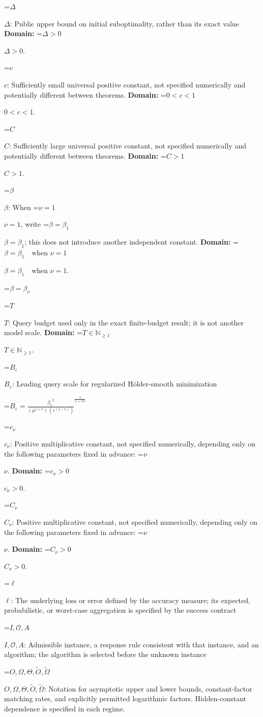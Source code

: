 \documentclass[10pt,a4paper]{article}
\newcommand{\AtlasMath}[1]{\par\begingroup\centering\setbox0=\hbox{$\displaystyle #1$}\ifdim\wd0>1.4\linewidth\typeout{ATLAS WIDE FORMULA: \the\wd0}\fi\ifdim\wd0>\linewidth\resizebox{\linewidth}{!}{\box0}\else\box0\fi\par\endgroup}
\newcommand{\AtlasInlineMath}[1]{\begingroup\setbox0=\hbox{$#1$}\ifdim\wd0>.4\linewidth\endgroup\AtlasMath{#1}\else\endgroup$#1$\fi}
\begin{document}
\AtlasInlineMath{\Delta}: Public upper bound on initial suboptimality, rather than its exact value \textbf{Domain:} \AtlasInlineMath{\Delta>0}.

\AtlasInlineMath{c}: Sufficiently small universal positive constant, not specified numerically and potentially different between theorems. \textbf{Domain:} \AtlasInlineMath{0<c<1}.

\AtlasInlineMath{C}: Sufficiently large universal positive constant, not specified numerically and potentially different between theorems. \textbf{Domain:} \AtlasInlineMath{C>1}.

\AtlasInlineMath{\beta}: When \AtlasInlineMath{\nu=1}, write \AtlasInlineMath{\beta=\beta_1}; this does not introduce another independent constant. \textbf{Domain:} \AtlasInlineMath{\beta=\beta_1\quad\text{when }\nu=1}.


\AtlasMath{\beta=\beta_\nu}


\AtlasInlineMath{T}: Query budget used only in the exact finite-budget result; it is not another model scale. \textbf{Domain:} \AtlasInlineMath{T\in\mathbb{N}_{\ge1}}.

\AtlasInlineMath{B_\varepsilon}: Leading query scale for regularized Hölder-smooth minimization


\AtlasMath{B_\varepsilon={\frac{{\beta_\nu}^{2}}{({\mu}^{1+\nu})\,({\varepsilon}^{(1-\nu)})}}^{\frac{1}{1+3\,\nu}}}


\AtlasInlineMath{c_{\nu}}: Positive multiplicative constant, not specified numerically, depending only on the following parameters fixed in advance: \AtlasInlineMath{\nu}. \textbf{Domain:} \AtlasInlineMath{c_{\nu}>0}.

\AtlasInlineMath{C_{\nu}}: Positive multiplicative constant, not specified numerically, depending only on the following parameters fixed in advance: \AtlasInlineMath{\nu}. \textbf{Domain:} \AtlasInlineMath{C_{\nu}>0}.

\AtlasInlineMath{\ell}: The underlying loss or error defined by the accuracy measure; its expected, probabilistic, or worst-case aggregation is specified by the success contract

\AtlasInlineMath{I,\mathcal{O},A}: Admissible instance, a response rule consistent with that instance, and an algorithm; the algorithm is selected before the unknown instance

\AtlasInlineMath{O,\Omega,\Theta,\widetilde{O},\widetilde\Omega}: Notation for asymptotic upper and lower bounds, constant-factor matching rates, and explicitly permitted logarithmic factors. Hidden-constant dependence is specified in each regime.
\end{document}
